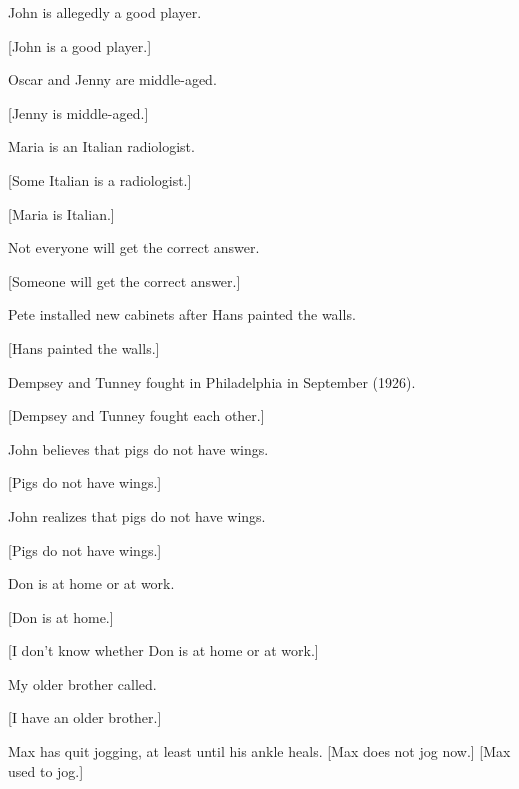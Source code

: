 {\setcounter{equation}{0}
\ea%

          John is allegedly a good player.

{}[John is a good player.]
    \z

\ea%
          Oscar and Jenny are middle-aged.

{}[Jenny is middle-aged.]
    \z

\ea%
          Maria is an  {Italian} radiologist.

\ea {}[Some  {Italian} is a radiologist.]

\ex {}[Maria is  {Italian}.]
    \z \z

\ea%
    Not everyone will get the correct answer.

{}[Someone will get the correct answer.]
    \z

\ea%
    Pete installed new cabinets after Hans painted the walls.

{}[Hans painted the walls.]
    \z

\ea%
          Dempsey and Tunney fought in Philadelphia in  September (1926).

{}[Dempsey and Tunney fought each other.]
    \z

\ea%
          John believes that pigs do not have wings.

{}[Pigs do not have wings.]
    \z

\ea%

          John realizes that pigs do not have wings.

{}[Pigs do not have wings.]
    \z

\ea%
    Don is at home or at work.

\ea {}[Don is at home.]

\ex {}[I don't know whether Don is at home or at work.]
    \z
    \z

\ea%
          My older brother called.

{}[I have an older brother.]
    \z

\ea%
          Max has quit jogging, at least until his ankle heals.
\ea
{}[Max does not jog now.]
\ex
{}[Max used to jog.]
    \z
    \z

}
